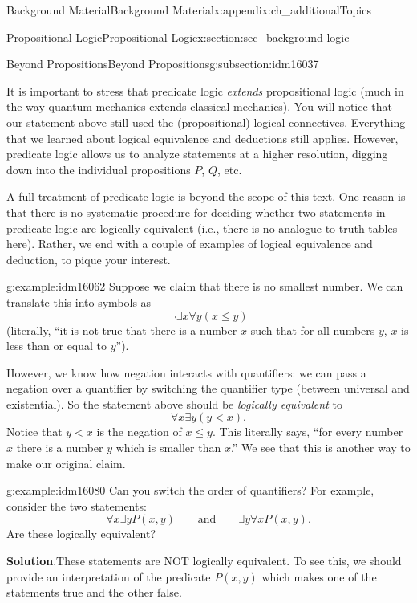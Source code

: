 \documentclass[oneside,10pt,]{book}
\numberwithin{equation}{chapter}
\newcommand{\lt}{<}
\begin{document}
\begin{appendixptx}{Background Material}{}{Background Material}{}{}{x:appendix:ch_additionalTopics}
\begin{sectionptx}{Propositional Logic}{}{Propositional Logic}{}{}{x:section:sec_background-logic}
\begin{subsectionptx}{Beyond Propositions}{}{Beyond Propositions}{}{}{g:subsection:idm16037}
\par
It is important to stress that predicate logic \emph{extends} propositional logic (much in the way quantum mechanics extends classical mechanics).  You will notice that our statement above still used the (propositional) logical connectives.  Everything that we learned about logical equivalence and deductions still applies.  However, predicate logic allows us to analyze statements at a higher resolution, digging down into the individual propositions \(P\), \(Q\), etc.%
\par
A full treatment of predicate logic is beyond the scope of this text.  One reason is that there is no systematic procedure for deciding whether two statements in predicate logic are logically equivalent (i.e., there is no analogue to truth tables here).  Rather, we end with a couple of examples of logical equivalence and deduction, to pique your interest.%
\begin{example}{}{g:example:idm16062}%
Suppose we claim that there is no smallest number.  We can translate this into symbols as%
\begin{equation*}
\neg \exists x \forall y (x \le y)
\end{equation*}
(literally, ``it is not true that there is a number \(x\) such that for all numbers \(y\), \(x\) is less than or equal to \(y\)'').%
\par
However, we know how negation interacts with quantifiers: we can pass a negation over a quantifier by switching the quantifier type (between universal and existential).  So the statement above should be \emph{logically equivalent} to%
\begin{equation*}
\forall x \exists y (y \lt x).
\end{equation*}
Notice that \(y \lt x\) is the negation of \(x \le y\).  This literally says, ``for every number \(x\) there is a number \(y\) which is smaller than \(x\).''  We see that this is another way to make our original claim.%
\end{example}
\begin{example}{}{g:example:idm16080}%
Can you switch the order of quantifiers? For example, consider the two statements:%
\begin{equation*}
\forall x \exists y P(x,y) \qquad \mathrm{ and } \qquad \exists y \forall x P(x,y).
\end{equation*}
Are these logically equivalent?%
\par\smallskip%
\noindent\textbf{Solution}.\hypertarget{g:solution:idm16084}{}\quad{}These statements are NOT logically equivalent. To see this, we should provide an interpretation of the predicate \(P(x,y)\) which makes one of the statements true and the other false.%

\end{example}
\end{subsectionptx}
\end{sectionptx}
\end{appendixptx}
\end{document}

